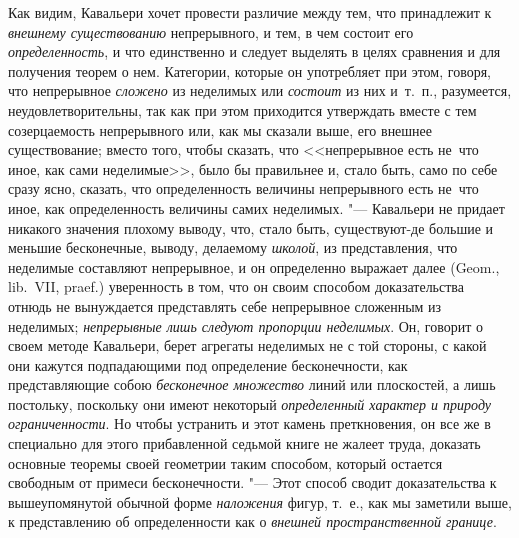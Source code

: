 Как видим, Кавальери хочет провести различие между тем, что принадлежит к
{\em внешнему существованию} непрерывного, и тем, в чем состоит его
{\em определенность}, и что единственно и следует выделять в целях сравнения и
для получения теорем о нем. Категории, которые он употребляет при этом, говоря,
что непрерывное {\em сложено} из неделимых или {\em состоит} из них и~т.~п.,
разумеется, неудовлетворительны, так как при этом приходится утверждать вместе
с тем созерцаемость непрерывного или, как мы сказали выше, его внешнее
существование; вместо того, чтобы сказать, что <<непрерывное есть не~что иное,
как сами неделимые>>, было бы правильнее и, стало быть, само по себе сразу
ясно, сказать, что определенность величины непрерывного есть не~что иное, как
определенность величины самих неделимых. "--- Кавальери не придает никакого
значения плохому выводу, что, стало быть, существуют-де большие и меньшие
бесконечные, выводу, делаемому {\em школой}, из представления, что неделимые
составляют непрерывное, и он определенно выражает далее (Geom., lib.~VII,
praef.) уверенность в том, что он своим способом доказательства отнюдь не
вынуждается представлять себе непрерывное сложенным из неделимых;
{\em непрерывные лишь следуют пропорции неделимых}. Он, говорит о своем методе
Кавальери, берет агрегаты неделимых не с той стороны, с какой они кажутся
подпадающими под определение бесконечности, как представляющие собою
{\em бесконечное множество} линий или плоскостей, а лишь постольку, поскольку
они имеют некоторый {\em определенный характер и природу ограниченности}. Но
чтобы устранить и этот камень преткновения, он все же в специально для этого
прибавленной седьмой книге не жалеет труда, доказать основные теоремы своей
геометрии таким способом, который остается свободным от примеси бесконечности.
"--- Этот способ сводит доказательства к вышеупомянутой обычной форме
{\em наложения} фигур, т.~е., как мы заметили выше, к представлению об
определенности как о {\em внешней пространственной границе}.

